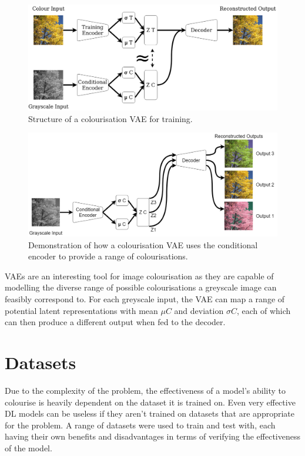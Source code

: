 \documentclass{l4proj}
\begin{document}
\begin{figure}[H]
    \centering
    \includegraphics[width=1.0\linewidth]{images/VAETraining.png}    

    \caption{Structure of a colourisation VAE for training.}

    \label{fig:vaetrain} 
\end{figure}
\begin{figure}[H]
    \centering
    \includegraphics[width=1.0\linewidth]{images/VAETesting.png}    

    \caption{Demonstration of how a colourisation VAE uses the conditional encoder to provide a range of colourisations.}

    \label{fig:vaetest} 
\end{figure}

VAEs are an interesting tool for image colourisation as they are capable of modelling the diverse range of possible colourisations a greyscale image can feasibly correspond to. For each greyscale input, the VAE can map a range of potential latent representations with mean $\mu C$ and deviation $\sigma C$, each of which can then produce a different output when fed to the decoder. 

\section{Datasets}
Due to the complexity of the problem, the effectiveness of a model's ability to colourise is heavily dependent on the dataset it is trained on. Even very effective DL models can be useless if they aren't trained on datasets that are appropriate for the problem. A range of datasets were used to train and test with, each having their own benefits and disadvantages in terms of verifying the effectiveness of the model.
\end{document}
